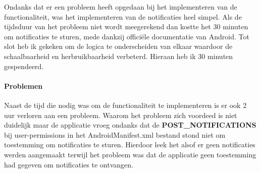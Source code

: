 Ondanks dat er een probleem heeft opgedaan bij het implementeren van de functionaliteit, was 
het implementeren van de notificaties heel simpel. Als de tijdsduur van het probleem niet wordt meegerekend 
dan kostte het 30 minuten om notificaties te sturen, mede dankzij officiële documentatie van Android.
Tot slot heb ik gekeken om de logica te onderscheiden van elkaar waardoor de schaalbaarheid 
en herbruikbaarheid verbeterd. Hieraan heb ik 30 minuten gespendeerd.

\paragraph{Problemen}
Naast de tijd die nodig was om de functionaliteit te implementeren is er ook 2 uur verloren aan een probleem. 
Waarom het probleem zich voordeed is niet duidelijk maar de applicatie vroeg ondanks dat de 
\textbf{POST\_NOTIFICATIONS} bij user-permissions in het AndroidManifest.xml bestand stond 
niet om toestemming om notificaties te sturen. Hierdoor leek het alsof er geen notificaties werden aangemaakt
terwijl het probleem was dat de applicatie geen toestemming had gegeven om notificaties te ontvangen.